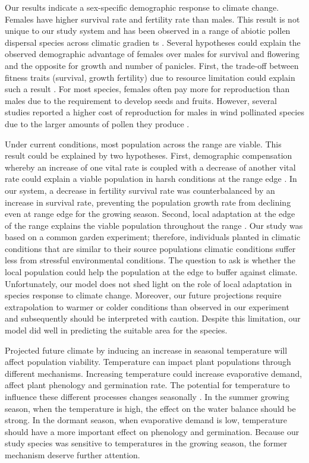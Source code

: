 \documentclass[12pt]{article}
\begin{document}
Our results indicate a sex-specific demographic response to climate change. 
Females have higher survival rate and fertility rate than males. 
This result is not unique to our study system and has been observed in a range of abiotic pollen dispersal species across climatic gradien ts \citep{welbergen2008climate,zhao2012sex,sasaki2019complex}. 
Several hypotheses could explain the observed demographic advantage of females over males for survival and flowering and the opposite for growth and number of panicles.
First, the trade-off between fitness traits (survival, growth fertility) due to resource limitation could explain such a result \citep{cipollini1994sexual,freeman1976differential}.
For most species, females often pay more for reproduction than males due to the requirement to develop seeds and fruits. 
However, several studies reported a higher cost of reproduction for males in wind pollinated species due to the larger amounts of pollen they produce \citep{burli2022environmental,hultine2016climate,cipollini1994sexual,bruijning2017surviving,field2013comparative}.

Under current conditions, most population across the range are viable.
This result could be explained by two hypotheses.
First, demographic compensation whereby an increase of one vital rate is coupled with a decrease of another vital rate could explain a viable population in harsh conditions at the range edge \citep{doak2010demographic,villellas2015demographic}. 
In our system, a decrease in fertility survival rate was counterbalanced by an increase in survival rate, preventing the population growth rate from declining even at range edge for the growing season.
Second, local adaptation at the edge of the range explains the viable population throughout the range \citep{miller2022two}. 
Our study was based on a common garden experiment; therefore, individuals planted in climatic conditions that are similar to their source populations climatic conditions suffer less from stressful environmental conditions.
The question to ask is whether the local population could help the population at the edge to buffer against climate.
Unfortunately, our model does not shed light on the role of local adaptation in species response to climate change. 
Moreover, our future projections require extrapolation to warmer or colder conditions than observed in our experiment and subsequently should be interpreted with caution. 
Despite this limitation, our model did well in predicting the suitable area for the species. 

Projected future climate by inducing an increase in seasonal temperature will affect population viability. 
Temperature can impact plant populations through different mechanisms. 
Increasing temperature could increase evaporative demand, affect plant phenology and germination rate. 
The potential for temperature to influence these different processes changes seasonally \citep{korner2006significance}. 
In the summer growing season, when the temperature is high, the effect on the water balance should be strong.
In the dormant season, when evaporative demand is low, temperature should have a more important effect on phenology and germination. Because our study species was sensitive to temperatures in the growing season, the former mechanism deserve further attention. 
\end{document}
